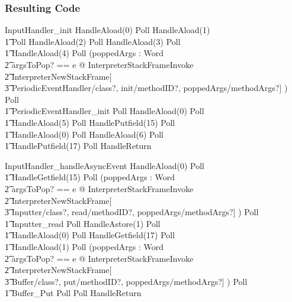 \documentclass{beamer}
\begin{document}
\begin{frame}[shrink]
  \frametitle{Resulting Code}
  \setlength{\zedleftsep}{0cm}
  \setlength{\zedindent}{0cm}
  \begin{circus}
    InputHandler\_init \circdef HandleAload(0) \circseq Poll \circseq HandleAload(1) \circseq \\
    \t1 Poll \circseq HandleAload(2) \circseq Poll \circseq HandleAload(3) \circseq Poll \circseq \\
    \t1 HandleAload(4) \circseq Poll \circseq (\circvar poppedArgs : \seq Word \circspot \\
    \t2 \lschexpract \exists argsToPop? == e @ InterpreterStackFrameInvoke \rschexpract \circseq \\
    \t2 \lschexpract InterpreterNewStackFrame[ \\
    \t3 PeriodicEventHandler/class?,  init/methodID?, poppedArgs/methodArgs?] \rschexpract) \circseq Poll \circseq \\
    \t1 PeriodicEventHandler\_init \circseq Poll \circseq HandleAload(0) \circseq Poll \circseq \\
    \t1 HandleAload(5) \circseq Poll \circseq HandlePutfield(15) \circseq Poll \circseq \\
    \t1 HandleAload(0) \circseq Poll \circseq HandleAload(6) \circseq Poll \circseq \\
    \t1 HandlePutfield(17) \circseq Poll \circseq HandleReturn
  \end{circus}
  \begin{circus}
    InputHandler\_handleAsyncEvent \circdef HandleAload(0) \circseq Poll \circseq \\
    \t1 HandleGetfield(15) \circseq Poll \circseq (\circvar poppedArgs : \seq Word \circspot \\
    \t2 \lschexpract \exists argsToPop? == e @ InterpreterStackFrameInvoke \rschexpract \circseq \\
    \t2 \lschexpract InterpreterNewStackFrame[ \\
    \t3 Inputter/class?,  read/methodID?, poppedArgs/methodArgs?] \rschexpract) \circseq Poll \circseq \\
    \t1 Inputter\_read \circseq Poll \circseq HandleAstore(1) \circseq Poll \circseq \\
    \t1 HandleAload(0) \circseq Poll \circseq HandleGetfield(17) \circseq Poll \circseq \\
    \t1 HandleAload(1) \circseq Poll \circseq (\circvar poppedArgs : \seq Word \circspot \\
      \t2 \lschexpract \exists argsToPop? == e @ InterpreterStackFrameInvoke \rschexpract \circseq \\
      \t2 \lschexpract InterpreterNewStackFrame[ \\
      \t3 Buffer/class?,  put/methodID?, poppedArgs/methodArgs?] \rschexpract) \circseq Poll \circseq \\
    \t1 Buffer\_Put \circseq Poll \circseq Poll \circseq HandleReturn
  \end{circus}
\end{frame}
\end{document}
